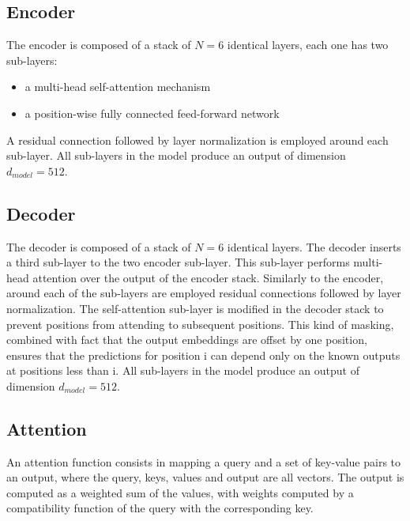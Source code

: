 \documentclass[\main/main.tex]{subfiles}
\begin{document}
\subsection{Encoder}
The encoder is composed of a stack of $N=6$ identical layers, each one has two sub-layers:
\begin{itemize}
    \item a multi-head self-attention mechanism
    \item a position-wise fully connected feed-forward network
\end{itemize}
A residual connection followed by layer normalization is employed around each sub-layer. All sub-layers in the model produce an output of dimension $d_{model} = 512$.

\subsection{Decoder}
The decoder is composed of a stack of $N=6$ identical layers. The decoder inserts a third sub-layer to the two encoder sub-layer. This sub-layer performs multi-head attention over the output of the encoder stack. Similarly to the encoder, around each of the sub-layers are employed residual connections followed by layer normalization. The self-attention sub-layer is modified in the decoder stack to prevent positions from attending to subsequent positions. This kind of masking, combined with fact that the output embeddings are offset by one position, ensures that the predictions for position i can depend only on the known outputs at positions less than i. All sub-layers in the model produce an output of dimension $d_{model} = 512$.

\subsection{Attention}
An attention function consists in mapping a query and a set of key-value pairs to an output, where the query, keys, values and output are all vectors. The output is computed as a weighted sum of the values, with weights computed by a compatibility function of the query with the corresponding key.
\end{document}

